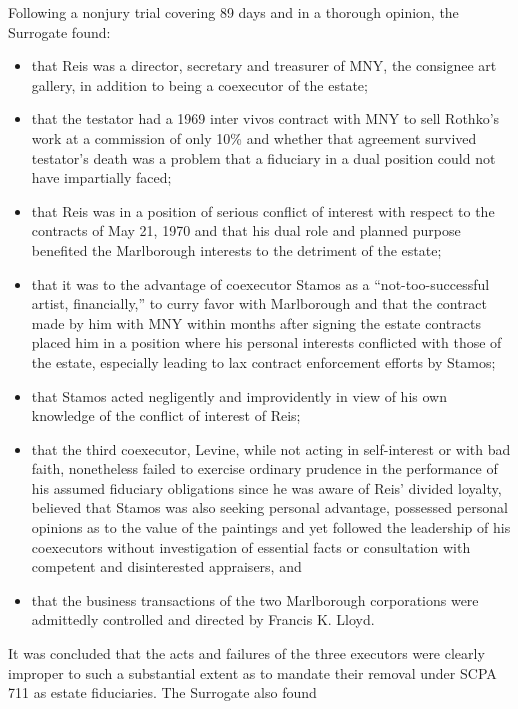 Following a nonjury trial covering 89 days and in a thorough opinion, the
Surrogate found:
\begin{itemize}
\item that Reis was a director, secretary and treasurer of MNY, the
consignee art gallery, in addition to being a coexecutor of the estate;
\item that the
testator had a 1969 inter vivos contract with MNY to sell Rothko's work at a
commission of only 10\% and whether that agreement survived testator's death was
a problem that a fiduciary in a dual position could not have impartially faced;
\item
that Reis was in a position of serious conflict of interest with respect to the
contracts of May 21, 1970 and that his dual role and planned purpose benefited
the Marlborough interests to the detriment of the estate;
\item that it was to the
advantage of coexecutor Stamos as a ``not-too-successful artist, financially,''
to curry favor with Marlborough and that the contract made by him with MNY
within months after signing the estate contracts placed him in a position where
his personal interests conflicted with those of the estate, especially leading
to lax contract enforcement efforts by Stamos;
\item that Stamos acted negligently and
improvidently in view of his own knowledge of the conflict of interest of Reis;
\item
that the third coexecutor, Levine, while not acting in self-interest or with bad
faith, nonetheless failed to exercise ordinary prudence in the performance of
his assumed fiduciary obligations since he was aware of Reis' divided loyalty,
believed that Stamos was also seeking personal advantage, possessed personal
opinions as to the value of the paintings and yet followed the leadership of his
coexecutors without investigation of essential facts or consultation with
competent and disinterested appraisers, and
\item that the business transactions of
the two Marlborough corporations were admittedly controlled and directed by
Francis K. Lloyd.
\end{itemize}
It was concluded that the acts and failures of the three
executors were clearly improper to such a substantial extent as to mandate their
removal under SCPA 711 as estate fiduciaries. The Surrogate also found
